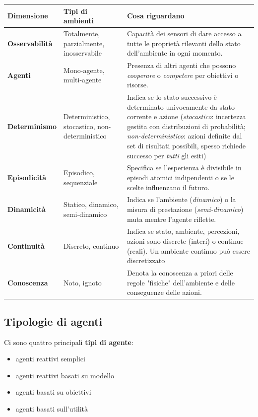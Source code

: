 \documentclass[a4paper,11pt]{report}
\begin{document}
\begin{table}[H]
\centering
\renewcommand{\arraystretch}{1.8} 
\begin{tabularx}{\textwidth}{|l|p{3.5cm}|X|}
\hline
\rowcolor[HTML]{EFEFEF} 
\textbf{Dimensione} & \textbf{Tipi di ambienti} & \textbf{Cosa riguardano} \\ \hline

\textbf{Osservabilità} & Totalmente, parzialmente, inosservabile & Capacità dei sensori di dare accesso a tutte le proprietà rilevanti dello stato dell'ambiente in ogni momento. \\ \hline

\textbf{Agenti} & Mono-agente, multi-agente & Presenza di altri agenti che possono \textit{cooperare} o \textit{competere} per obiettivi o risorse. \\ \hline

\textbf{Determinismo} & Deterministico, stocastico, non-deterministico & Indica se lo stato successivo è determinato univocamente da stato corrente e azione (\textit{stocastico}: incertezza gestita con distribuzioni di probabilità; \textit{non-deterministico}: azioni definite dal set di risultati possibili, spesso richiede successo per \textit{tutti} gli esiti) \\ \hline

\textbf{Episodicità} & Episodico, sequenziale & Specifica se l'esperienza è divisibile in episodi atomici indipendenti o se le scelte influenzano il futuro. \\ \hline

\textbf{Dinamicità} & Statico, dinamico, semi-dinamico & Indica se l'ambiente (\textit{dinamico}) o la misura di prestazione (\textit{semi-dinamico}) muta mentre l'agente riflette.\\ \hline

\textbf{Continuità} & Discreto, continuo & Indica se stato, ambiente, percezioni, azioni sono discrete (interi) o continue (reali). Un ambiente continuo può essere discretizzato\\ \hline

\textbf{Conoscenza} & Noto, ignoto & Denota la conoscenza a priori delle regole "fisiche" dell'ambiente e delle conseguenze delle azioni. \\ \hline
\end{tabularx}
\end{table}

\subsection{Tipologie di agenti}
Ci sono quattro principali \textbf{tipi di agente}:
\begin{itemize}
    \item agenti reattivi semplici
    \item agenti reattivi basati su modello
    \item agenti basati su obiettivi
    \item agenti basati sull'utilità
\end{itemize}
\end{document}

